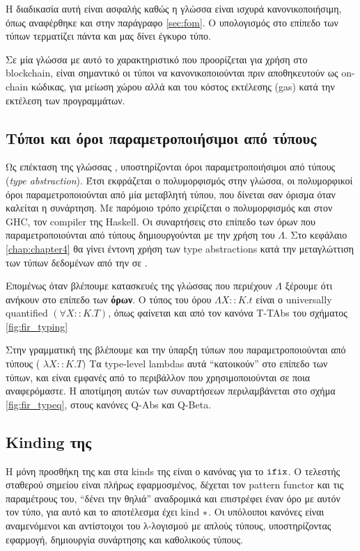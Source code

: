 Η διαδικασία αυτή είναι ασφαλής καθώς η γλώσσα \FOMF{} είναι ισχυρά
κανονικοποιήσιμη, όπως αναφέρθηκε και στην παράγραφο \ref{sec:fom}. Ο
υπολογισμός στο επίπεδο των τύπων τερματίζει πάντα και μας δίνει έγκυρο τύπο.

Σε μία γλώσσα με αυτό το χαρακτηριστικό που προορίζεται για χρήση στο
blockchain, είναι σημαντικό οι τύποι να κανονικοποιούνται πριν αποθηκευτούν ως
on-chain κώδικας, για μείωση χώρου αλλά και του κόστος εκτέλεσης (gas) κατά την
εκτέλεση των προγραμμάτων.


\subsection{Τύποι και όροι παραμετροποιήσιμοι από τύπους}

Ως επέκταση της γλώσσας \FOM, υποστηρίζονται όροι παραμετροποιήσιμοι από τύπους
(\emph{type abstraction}).  Έτσι εκφράζεται ο πολυμορφισμός στην γλώσσα, οι
πολυμορφικοί όροι παραμετροποιούνται από μία μεταβλητή τύπου, που δίνεται σαν
όρισμα όταν καλείται η συνάρτηση. Με παρόμοιο τρόπο χειρίζεται ο πολυμορφισμός
και στον GHC, τον compiler της Haskell. Οι συναρτήσεις στο επίπεδο των όρων που
παραμετροποιούνται από τύπους δημιουργούνται με την χρήση του $\Lambda$. Στο
κεφάλαιο \ref{chap:chapter4} θα γίνει έντονη χρήση των type abstractions κατά
την μεταγλώττιση των τύπων δεδομένων από την \FIR{} σε \FOMF{}.


Επομένως όταν βλέπουμε κατασκευές της γλώσσας που περιέχουν $\Lambda$ ξέρουμε
ότι ανήκουν στο επίπεδο των \textbf{όρων}. Ο τύπος του όρου $ \Lambda X :: K .
t $ είναι ο universally quantified $(\forall X::K.T)$, όπως φαίνεται και από
τον κανόνα T-TAbs του σχήματος \ref{fig:fir_typing}

Στην γραμματική της \FOMF{} βλέπουμε και την ύπαρξη τύπων που
παραμετροποιούνται από τύπους ( $\lambda X :: K. T)$ Τα type-level lambdas
αυτά ``κατοικούν'' στο επίπεδο των τύπων, και είναι εμφανές από το περιβάλλον που
χρησιμοποιούνται σε ποια αναφερόμαστε. Η αποτίμηση αυτών των συναρτήσεων
περιλαμβάνεται στο σχήμα \ref{fig:fir_typeq}, στους κανόνες Q-Abs και Q-Beta.



\subsection{Kinding της \FOMF{}}

Η μόνη προσθήκη της \FOMF{} και \FIR{} στα kinds της \FOM{} είναι ο κανόνας για
το $\operatorname{\texttt{ifix}}$. Ο τελεστής σταθερού σημείου είναι πλήρως εφαρμοσμένος, δέχεται τον
pattern functor και τις παραμέτρους  του, ``δένει την θηλιά'' αναδρομικά και
επιστρέφει έναν όρο με αυτόν τον τύπο, για αυτό και το αποτέλεσμα έχει kind
$\operatorname{\ast}$. Οι υπόλοιποι κανόνες είναι αναμενόμενοι και αντίστοιχοι του λ-λογισμού
με απλούς τύπους, υποστηρίζοντας εφαρμογή, δημιουργία συνάρτησης και καθολικούς
τύπους.

\vspace{1cm}
